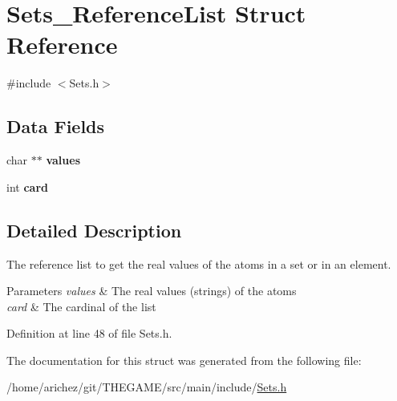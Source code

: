 \hypertarget{struct_sets___reference_list}{\section{Sets\-\_\-\-Reference\-List Struct Reference}
\label{struct_sets___reference_list}
}


{\ttfamily \#include $<$Sets.\-h$>$}

\subsection*{Data Fields}
\begin{DoxyCompactItemize}
\item 
\hypertarget{struct_sets___reference_list_ada2188333c6f540ad9cbe7c0e17003db}{char $\ast$$\ast$ {\bfseries values}}\label{struct_sets___reference_list_ada2188333c6f540ad9cbe7c0e17003db}

\item 
\hypertarget{struct_sets___reference_list_acd789e381a684163a021e2d228653afd}{int {\bfseries card}}\label{struct_sets___reference_list_acd789e381a684163a021e2d228653afd}

\end{DoxyCompactItemize}


\subsection{Detailed Description}
The reference list to get the real values of the atoms in a set or in an element. 
\begin{DoxyParams}{Parameters}
{\em values} & The real values (strings) of the atoms \\
\hline
{\em card} & The cardinal of the list \\
\hline
\end{DoxyParams}


Definition at line 48 of file Sets.\-h.



The documentation for this struct was generated from the following file\-:\begin{DoxyCompactItemize}
\item 
/home/arichez/git/\-T\-H\-E\-G\-A\-M\-E/src/main/include/\hyperlink{_sets_8h}{Sets.\-h}\end{DoxyCompactItemize}
